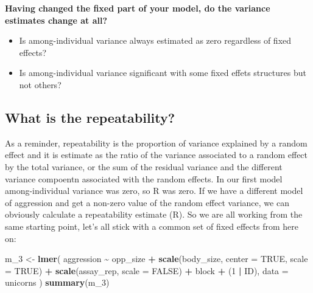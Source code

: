 \documentclass[
  12pt,
]{book}
\makeatletter
\newenvironment{Shaded}{\begin{snugshade}}{\end{snugshade}}
\newcommand{\DataTypeTok}[1]{\textcolor[rgb]{0.13,0.29,0.53}{#1}}
\newcommand{\DecValTok}[1]{\textcolor[rgb]{0.00,0.00,0.81}{#1}}
\newcommand{\KeywordTok}[1]{\textcolor[rgb]{0.13,0.29,0.53}{\textbf{#1}}}
\newcommand{\NormalTok}[1]{#1}
\newcommand{\OperatorTok}[1]{\textcolor[rgb]{0.81,0.36,0.00}{\textbf{#1}}}
\newcommand{\OtherTok}[1]{\textcolor[rgb]{0.56,0.35,0.01}{#1}}
\newcommand{\StringTok}[1]{\textcolor[rgb]{0.31,0.60,0.02}{#1}}
\providecommand{\tightlist}{%
  \setlength{\itemsep}{0pt}\setlength{\parskip}{0pt}}
\newenvironment{kframe}{%
\medskip{}
\setlength{\fboxsep}{.8em}
\def\at@end@of@kframe{}%
\ifinner\ifhmode%
 \def\at@end@of@kframe{\end{minipage}}%
 \begin{minipage}{\columnwidth}%
\fi\fi%
\def\FrameCommand##1{\hskip\@totalleftmargin \hskip-\fboxsep
\colorbox{incolor}{##1}\hskip-\fboxsep
    \hskip-\linewidth \hskip-\@totalleftmargin \hskip\columnwidth}%
\MakeFramed {\advance\hsize-\width
  \@totalleftmargin\z@ \linewidth\hsize
  \@setminipage}}%
{\par\unskip\endMakeFramed%
\at@end@of@kframe}
\newenvironment{rmdblock}[1]
 {
 \begin{itemize}
 \renewcommand{\labelitemi}{
   \raisebox{-.7\height}[0pt][0pt]{
     {\setkeys{Gin}{width=3em,keepaspectratio}\texttt{[image: images/icons/\#1]}}
   }
 }
 \begin{kframe}
 \setlength{\fboxsep}{1em}
 \item
 }
 {
 \end{kframe}
 \end{itemize}
 }
\newenvironment{rmdcode}
  {\begin{rmdblock}{code}}
  {\end{rmdblock}}
\makeatother
\begin{document}
\begin{rmdcode}
\textbf{Having changed the fixed part of your model, do the variance estimates change at all?}

\begin{itemize}
\tightlist
\item
  Is among-individual variance always estimated as zero regardless of fixed effects?
\item
  Is among-individual variance significant with some fixed effets structures but not others?
\end{itemize}
\end{rmdcode}

\hypertarget{what-is-the-repeatability}{%
\subsection{What is the repeatability?}\label{what-is-the-repeatability}}

As a reminder, repeatability is the proportion of variance explained by a random effect and it is estimate as the ratio of the variance associated to a random effect by the total variance, or the sum of the residual variance and the different variance compoentn associated with the random effects.
In our first model among-individual variance was zero, so R was zero. If we have a different model of aggression and get a non-zero value of the random effect variance, we can obviously calculate a repeatability estimate (R). So we are all working from the same starting point, let's all stick with a common set of fixed effects from here on:

\begin{Shaded}
\begin{Highlighting}[]
\NormalTok{m\_}\DecValTok{3}\NormalTok{ \textless{}{-}}\StringTok{ }\KeywordTok{lmer}\NormalTok{(}
\NormalTok{  aggression }\OperatorTok{\textasciitilde{}}\StringTok{ }\NormalTok{opp\_size }\OperatorTok{+}\StringTok{ }\KeywordTok{scale}\NormalTok{(body\_size, }\DataTypeTok{center =} \OtherTok{TRUE}\NormalTok{, }\DataTypeTok{scale =} \OtherTok{TRUE}\NormalTok{)}
    \OperatorTok{+}\StringTok{ }\KeywordTok{scale}\NormalTok{(assay\_rep, }\DataTypeTok{scale =} \OtherTok{FALSE}\NormalTok{) }\OperatorTok{+}\StringTok{ }\NormalTok{block}
    \OperatorTok{+}\StringTok{ }\NormalTok{(}\DecValTok{1} \OperatorTok{|}\StringTok{ }\NormalTok{ID),}
  \DataTypeTok{data =}\NormalTok{ unicorns}
\NormalTok{)}
\KeywordTok{summary}\NormalTok{(m\_}\DecValTok{3}\NormalTok{)}
\end{Highlighting}
\end{Shaded}
\end{document}
